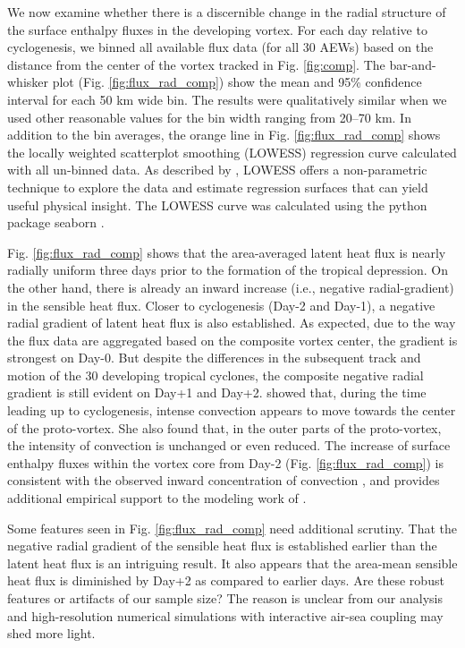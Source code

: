 \documentclass[draft]{agujournal2019}
\begin{document}
We now examine whether there is a discernible change in the radial structure of the surface enthalpy fluxes in the developing vortex. For each day relative to cyclogenesis, we binned all available flux data (for all 30 AEWs) based on the distance from the center of the vortex tracked in Fig. \ref{fig:comp}. 
The bar-and-whisker plot (Fig. \ref{fig:flux_rad_comp}) show the mean and 
95\% confidence interval for each 50 km wide bin.  The results were qualitatively similar when we used other reasonable values for the bin width ranging from 20--70 km. In addition to the bin averages, the orange line in Fig. \ref{fig:flux_rad_comp} shows the locally weighted scatterplot smoothing (LOWESS) regression curve calculated with all un-binned data. As described by , LOWESS offers a non-parametric technique to explore the data and estimate regression surfaces that can yield useful physical insight. The LOWESS curve was calculated using the python package seaborn \cite{Waskom2021}.
 

Fig. \ref{fig:flux_rad_comp} shows that the area-averaged latent heat flux is nearly radially uniform three days prior to the formation of the tropical depression. On the other hand, there is already an inward increase  (i.e., negative radial-gradient) in the sensible heat flux. Closer to cyclogenesis (Day-2 and Day-1), a negative radial gradient of latent heat flux is also established. As expected, due to the way the flux data are aggregated based on the composite vortex center, the gradient is strongest on Day-0. But despite the differences in the subsequent track and motion of the 30 developing tropical cyclones, the composite negative radial gradient is still evident on  Day+1 and Day+2.  showed that, during the time leading up to cyclogenesis, intense convection appears to move towards the center of the proto-vortex. She also found that, in the outer parts of the proto-vortex, the intensity of convection is unchanged or even reduced. The increase of surface enthalpy fluxes within the vortex core from Day-2 (Fig. \ref{fig:flux_rad_comp}) is consistent with the observed inward concentration of convection \cite{WZ2018}, and provides additional empirical support to the modeling work of . 

Some features seen in Fig. \ref{fig:flux_rad_comp} need additional scrutiny. That the negative radial gradient of the sensible heat flux is established earlier than the latent heat flux is an intriguing result.  It also appears that the area-mean sensible heat flux is diminished by Day+2 as compared to earlier days. Are these robust features or artifacts of our sample size?  The reason is unclear from our analysis and high-resolution numerical simulations with interactive air-sea coupling may shed more light. 
\end{document}
